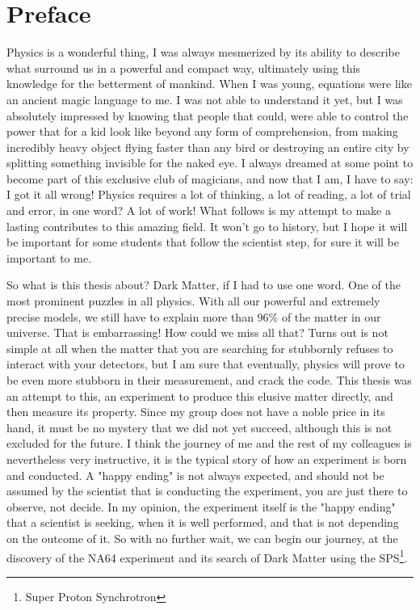 \chapter*{Preface} %
\label{preface}

Physics is a wonderful thing, I was always mesmerized by its ability to describe what surround us in a powerful and compact way, ultimately using this knowledge for the betterment of mankind. When I was young, equations were like an ancient magic language to me. I was not able to understand it yet, but I was absolutely impressed by knowing that people that could, were able to control the power that for a kid look like beyond any form of comprehension, from making incredibly heavy object flying faster than any bird or destroying an entire city by splitting something invisible for the naked eye. I always dreamed at some point to become part of this exclusive club of magicians, and now that I am, I have to say: I got it all wrong! Physics requires a lot of thinking, a lot of reading, a lot of trial and error, in one word? A lot of work! What follows is my attempt to make a lasting contributes to this amazing field. It won't go to history, but I hope it will be important for some students that follow the scientist step, for sure it will be important to me.

So what is this thesis about? Dark Matter, if I had to use one word. One of the most prominent puzzles in all physics. With all our powerful and extremely precise models, we still have to explain more than 96\% of the matter in our universe. That is embarrassing! How could we miss all that? Turns out is not simple at all when the matter that you are searching for stubbornly refuses to interact with your detectors, but I am sure that eventually, physics will prove to be even more stubborn in their measurement, and crack the code. This thesis was an attempt to this, an experiment to produce this elusive matter directly, and then measure its property. Since my group does not have a noble price in its hand, it must be no mystery that we did not yet succeed, although this is not excluded for the future. I think the journey of me and the rest of my colleagues is nevertheless very instructive, it is the typical story of how an experiment is born and conducted. A "happy ending" is not always expected, and should not be assumed by the scientist that is conducting the experiment, you are just there to observe, not decide. In my opinion, the experiment itself is the "happy ending" that a scientist is seeking, when it is well performed, and that is not depending on the outcome of it. So with no further wait, we can begin our journey, at the discovery of the NA64 experiment and its search of Dark Matter using the SPS\footnote{Super Proton Synchrotron}.

